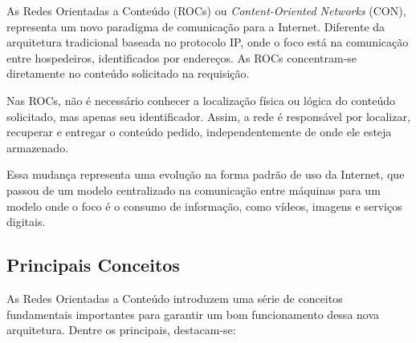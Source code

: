 \documentclass[12pt]{article}
\begin{document}
As Redes Orientadas a Conteúdo (ROCs) ou \textit{Content-Oriented Networks} (CON), representa um novo paradigma de comunicação para a Internet. Diferente da arquitetura tradicional baseada no protocolo IP, onde o foco está na comunicação entre hospedeiros, identificados por endereços. As ROCs concentram-se diretamente no conteúdo solicitado na requisição.

Nas ROCs, não é necessário conhecer a localização física ou lógica do conteúdo solicitado, mas apenas seu identificador. Assim, a rede é responsável por localizar, recuperar e entregar o conteúdo pedido, independentemente de onde ele esteja armazenado. 

Essa mudança representa uma evolução na forma padrão de uso da Internet, que passou de um modelo centralizado na comunicação entre máquinas para um modelo onde o foco é o consumo de informação, como vídeos, imagens e serviços digitais.

\FloatBarrier
\subsection{Principais Conceitos}

As Redes Orientadas a Conteúdo introduzem uma série de conceitos fundamentais importantes para garantir um bom funcionamento dessa nova arquitetura. Dentre os principais, destacam-se:
\end{document}
